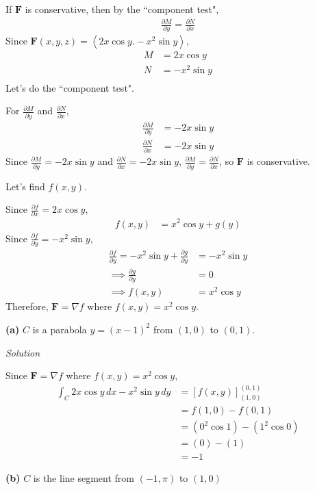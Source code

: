\documentclass{article}
\newcommand{\lrp}[1]{\left( #1 \right)}
\newcommand{\lra}[1]{\left\langle #1 \right\rangle}
\newcommand{\lrb}[1]{\left[ #1 \right]}
\newcommand{\F}[0]{\mathbf{F}}
\newcommand{\Solution}{\textit{Solution}}
\begin{document}
If $\F$ is conservative, then by the ``component test",
\begin{align*}
    \frac{\partial M}{\partial y}=\frac{\partial N}{\partial x}
\end{align*}
Since $\displaystyle\F(x,y,z)=\lra{2x\cos y. -x^2\sin y}$, \begin{align*}
    M&=2x\cos y\\
    N&=-x^2\sin y\\
\end{align*}
Let's do the ``component test".
{}
For $\displaystyle \frac{\partial M}{\partial y}$ and $\displaystyle\frac{\partial N}{\partial x}$,
\begin{align*}
    \frac{\partial M}{\partial y}&= -2x\sin y\\
    \frac{\partial N}{\partial x}&=-2x\sin y
\end{align*}
Since $\displaystyle \frac{\partial M}{\partial y}=-2x\sin y$ and $\frac{\partial N}{\partial x}=-2x\sin y$, $\displaystyle \frac{\partial M}{\partial y}=\frac{\partial N}{\partial x}$, so $\F$ is conservative.

Let's find $f(x,y)$.

Since $\displaystyle \frac{\partial f}{\partial x}=2x\cos y$,
\begin{align*}
    f(x,y)&=x^2\cos y + g(y)
\end{align*}
Since $\displaystyle \frac{\partial f}{\partial y}=-x^2\sin y$,
\begin{align*}
    \frac{\partial f}{\partial y}=-x^2\sin y + \frac{\partial g}{\partial y}&=-x^2\sin y\\
    \implies \frac{\partial g}{\partial y}&=0\\
    \implies f(x,y)&=x^2\cos y\tag{let $C=0$ aka ignore $C$}
\end{align*}
Therefore, $\F = \nabla f$ where $f(x,y)=x^2\cos y$.

\textbf{(a)} $C$ is a parabola $y=(x-1)^2$ from $(1,0)$ to $(0,1)$.

\Solution

Since $\F = \nabla f$ where $f(x,y)=x^2\cos y$,
\begin{align*}
    \int_C 2x\cos y\,dx -x^2\sin y\,dy&=\lrb{f(x,y)}_{(1,0)}^{(0,1)}\\
    &=f(1,0)-f(0,1)\\
    &=\lrp{0^2\cos 1}-\lrp{1^2\cos 0}\\
    &=\lrp{0}-\lrp{1}\\
    &=\boxed{-1}
\end{align*}
{}\textbf{(b)} $C$ is the line segment from $(-1,\pi)$ to $(1,0)$
\end{document}
